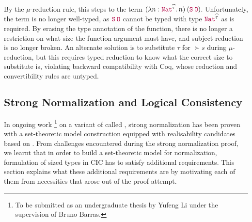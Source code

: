 By the $\mu$-reduction rule, this steps to the term $\app{(\abs{n}{\Nat^{\succ{\tau}}}{n})}{(\app{\Succ}{\Zero})}$.
Unfortunately, the term is no longer well-typed, as $\app{\Succ}{\Zero}$ cannot be typed with type $\Nat^{\succ{\tau}}$ as is required.
By erasing the type annotation of the function,
there is no longer a restriction on what size the function argument must have,
and subject reduction is no longer broken.
An alternate solution is to substitute $\tau$ for $\succ{s}$ during $\mu$-reduction,
but this requires typed reduction to know what the correct size to substitute is,
violating backward compatibility with Coq,
whose reduction and convertibility rules are untyped.

\subsection{Strong Normalization and Logical Consistency}\label{sec:metatheory:sn}

In ongoing work%
\footnote{To be submitted as an undergraduate thesis by Yufeng Li
  under the supervision of Bruno Barras.}  on a variant of \lang
called \langAnother, strong normalization has been proven with a
set-theoretic model construction equipped with realisability
candidates based on \citet{barras-thesis}.
%
From challenges encountered during the strong normalization proof, we
learnt that in order to build a set-theoretic model for normalization,
formulation of sized types in CIC has to satisfy additional
requirements.
%
This section explains what these additional requirements are by
motivating each of them from necessities that arose out of the proof
attempt.

